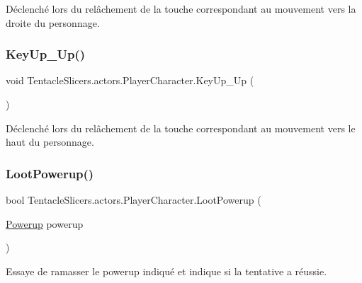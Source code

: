 Déclenché lors du relâchement de la touche correspondant au mouvement vers la droite du personnage. 

\mbox{\label{class_tentacle_slicers_1_1actors_1_1_player_character_a4d847691e46394ff398a4df2297c442b}} 
\subsubsection{\texorpdfstring{Key\+Up\+\_\+\+Up()}{KeyUp\_Up()}}
{\footnotesize\ttfamily void Tentacle\+Slicers.\+actors.\+Player\+Character.\+Key\+Up\+\_\+\+Up (\begin{DoxyParamCaption}{ }\end{DoxyParamCaption})}



Déclenché lors du relâchement de la touche correspondant au mouvement vers le haut du personnage. 

\mbox{\label{class_tentacle_slicers_1_1actors_1_1_player_character_aa137852ffa3d88b5f75fc8ba0f020651}} 
\subsubsection{\texorpdfstring{Loot\+Powerup()}{LootPowerup()}}
{\footnotesize\ttfamily bool Tentacle\+Slicers.\+actors.\+Player\+Character.\+Loot\+Powerup (\begin{DoxyParamCaption}\item[{\hyperlink{class_tentacle_slicers_1_1actors_1_1_powerup}{Powerup}}]{powerup }\end{DoxyParamCaption})}



Essaye de ramasser le powerup indiqué et indique si la tentative a réussie. 


